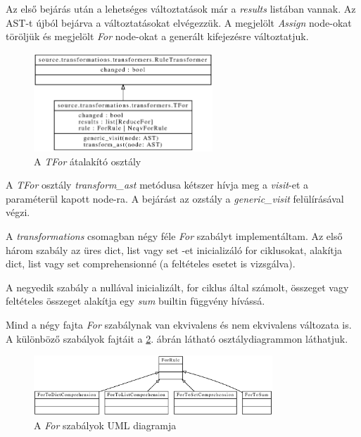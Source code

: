 Az első bejárás után a lehetséges változtatások már a \emph{results} listában vannak.
Az AST-t újból bejárva a változtatásokat elvégezzük.
A megjelölt \emph{Assign} node-okat töröljük
és megjelölt \emph{For} node-okat a generált kifejezésre változtatjuk.

\begin{figure}[H]
	\centering
	\includegraphics[width=0.6\textwidth]{images/uml/TFor.eps}
	\caption{\label{fig:TFor}A \emph{TFor} átalakító osztály}
\end{figure}

A \emph{TFor} osztály \emph{transform\_ast} metódusa kétszer hívja
meg a \emph{visit}-et a paraméterül kapott node-ra.
A bejárást az ozstály a \emph{generic\_visit} felülírásával végzi.

A \emph{transformations} csomagban négy féle \emph{For} szabályt implementáltam.
Az első három szabály az üres dict, list vagy set -et inicializáló for ciklusokat,
alakítja dict, list vagy set comprehensionné (a feltételes esetet is vizsgálva).

A negyedik szabály a nullával inicializált, for ciklus által számolt,
összeget vagy feltételes összeget alakítja
egy \emph{sum} builtin függvény hívássá.

Mind a négy fajta \emph{For} szabálynak van ekvivalens és nem ekvivalens változata is.
A különböző szabályok fajtáit a \ref{fig:ForRules}. ábrán látható osztálydiagrammon láthatjuk.

\begin{figure}[H]
	\centering
	\includegraphics[width=0.8\textwidth]{images/uml/ForRules.eps}
	\caption{\label{fig:ForRules}A \emph{For} szabályok UML diagramja}
\end{figure}

\pagebreak

